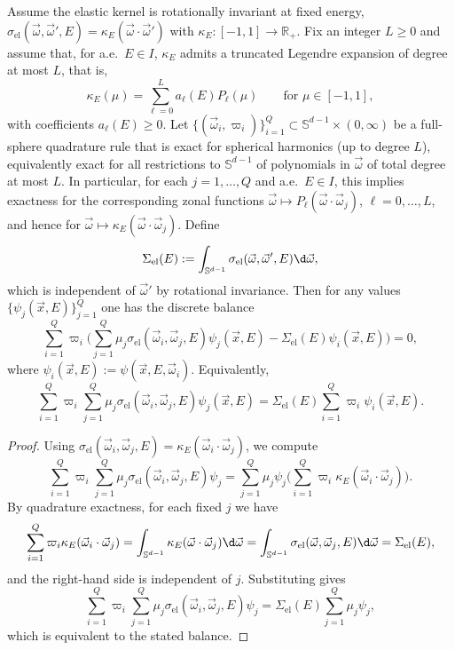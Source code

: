 \documentclass[final]{amsart}
\begin{document}
\begin{proposition}
\label{prop:conservation}
Assume the elastic kernel is rotationally invariant at fixed energy,
$\sigma_{\mathrm{el}}(\vec{\omega},\vec{\omega}',E)
=\kappa_E(\vec{\omega}\cdot\vec{\omega}')$ with
$\kappa_E:[-1,1]\to\mathbb{R}_+$. Fix an integer $L\ge 0$ and assume that,
for a.e.\ $E\in I$, $\kappa_E$ admits a truncated Legendre expansion of
degree at most $L$, that is,
\[
  \kappa_E(\mu) = \sum_{\ell=0}^{L} a_\ell(E) P_\ell(\mu)
  \qquad\text{for }\mu\in[-1,1],
\]
with coefficients $a_\ell(E)\ge 0$. Let
$\{(\vec{\omega}_i,\varpi_i)\}_{i=1}^Q\subset
\mathbb{S}^{d-1}\times(0,\infty)$ be a full-sphere quadrature rule
that is exact for spherical harmonics (up to degree $L$), equivalently
exact for all restrictions to $\mathbb S^{d-1}$ of polynomials in
$\vec\omega$ of total degree at most $L$. In particular, for each
$j=1,\dots,Q$ and a.e.\ $E\in I$, this implies exactness for the
corresponding zonal functions $\vec{\omega}\mapsto
P_\ell(\vec{\omega}\cdot\vec{\omega}_j)$, $\ell=0,\dots,L$, and hence
for $\vec{\omega}\mapsto
\kappa_E(\vec{\omega}\cdot\vec{\omega}_j)$. Define
\[
  \Sigma_{\mathrm{el}}(E)
  :=
  \int_{\mathbb{S}^{d-1}}
  \sigma_{\mathrm{el}}(\vec{\omega},\vec{\omega}',E) \d\vec{\omega},
\]
which is independent of $\vec{\omega}'$ by rotational invariance. Then
for any values $\{\psi_j(\vec{x},E)\}_{j=1}^Q$ one has the discrete balance
\[
  \sum_{i=1}^Q \varpi_i
  \Big(
    \sum_{j=1}^Q \mu_j 
    \sigma_{\mathrm{el}}(\vec{\omega}_i,\vec{\omega}_j,E) 
    \psi_j(\vec{x},E)
    -
    \Sigma_{\mathrm{el}}(E) \psi_i(\vec{x},E)
  \Big)
  = 0,
\]
where $\psi_i(\vec{x},E):=\psi(\vec{x},E,\vec{\omega}_i)$. Equivalently,
\[
  \sum_{i=1}^Q \varpi_i \sum_{j=1}^Q \mu_j 
  \sigma_{\mathrm{el}}(\vec{\omega}_i,\vec{\omega}_j,E) 
  \psi_j(\vec{x},E)
  =
  \Sigma_{\mathrm{el}}(E)\sum_{i=1}^Q \varpi_i \psi_i(\vec{x},E).
\]
\end{proposition}

\begin{proof}
Using
$\sigma_{\mathrm{el}}(\vec{\omega}_i,\vec{\omega}_j,E)=\kappa_E(\vec{\omega}_i\cdot\vec{\omega}_j)$,
we compute
\[
  \sum_{i=1}^Q \varpi_i \sum_{j=1}^Q \mu_j 
  \sigma_{\mathrm{el}}(\vec{\omega}_i,\vec{\omega}_j,E) \psi_j
  =
  \sum_{j=1}^Q \mu_j \psi_j
  \Big(\sum_{i=1}^Q \varpi_i \kappa_E(\vec{\omega}_i\cdot\vec{\omega}_j)\Big).
\]
By quadrature exactness, for each fixed $j$ we have
\[
  \sum_{i=1}^Q \varpi_i \kappa_E(\vec{\omega}_i\cdot\vec{\omega}_j)
  =
  \int_{\mathbb{S}^{d-1}} \kappa_E(\vec{\omega}\cdot\vec{\omega}_j) \d\vec{\omega}
  =
  \int_{\mathbb{S}^{d-1}} \sigma_{\mathrm{el}}(\vec{\omega},\vec{\omega}_j,E) \d\vec{\omega}
  =
  \Sigma_{\mathrm{el}}(E),
\]
and the right-hand side is independent of $j$. Substituting gives
\[
  \sum_{i=1}^Q \varpi_i \sum_{j=1}^Q \mu_j 
  \sigma_{\mathrm{el}}(\vec{\omega}_i,\vec{\omega}_j,E) \psi_j
  =
  \Sigma_{\mathrm{el}}(E)\sum_{j=1}^Q \mu_j \psi_j,
\]
which is equivalent to the stated balance.
\end{proof}
\end{document}
